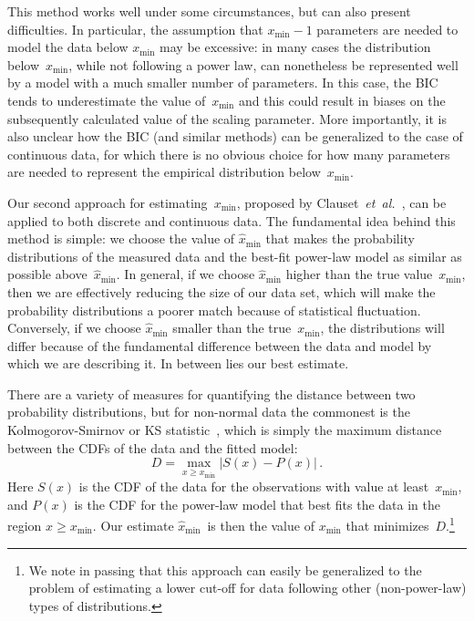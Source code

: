 \documentclass[final]{siamltex}
\newcommand{\etal}{\textit{et~al.}}
\newcommand{\xmin}{\ensuremath{x_{\min}}}
\newcommand{\punctspace}{\,}
\begin{document}
This method works well under some circumstances, but can also present
difficulties.  In particular, the assumption that $\xmin-1$ parameters are
needed to model the data below $\xmin$ may be excessive: in many cases the
distribution below~$\xmin$, while not following a power law, can
nonetheless be represented well by a model with a much smaller number of
parameters.  In this case, the BIC tends to underestimate the value
of~$\xmin$ and this could result in biases on the subsequently calculated
value of the scaling parameter.  More importantly, it is also unclear how
the BIC (and similar methods) can be generalized to the case of continuous
data, for which there is no obvious choice for how many parameters are
needed to represent the empirical distribution below~$\xmin$.

Our second approach for estimating~$\xmin$, proposed by
Clauset~\etal~\cite{Clauset07}, can be applied to both discrete and
continuous data.  The fundamental idea behind this method is simple: we
choose the value of $\hat{x}_{\min}$ that makes the probability
distributions of the measured data and the best-fit power-law model as
similar as possible above~$\hat{x}_{\min}$.  In general, if we choose
$\hat{x}_{\min}$ higher than the true value~$\xmin$, then we are
effectively reducing the size of our data set, which will make the
probability distributions a poorer match because of statistical
fluctuation.  Conversely, if we choose $\hat{x}_{\min}$ smaller than the
true~$\xmin$, the distributions will differ because of the fundamental
difference between the data and model by which we are describing it.  In
between lies our best estimate.

There are a variety of measures for quantifying the distance between two
probability distributions, but for non-normal data the commonest is the
Kolmogorov-Smirnov or KS statistic~\cite{Numerical-Recipes-in-C}, which is
simply the maximum distance between the CDFs of the data and the fitted model:
\begin{equation}
 D = \max_{x\ge \xmin} \left| S(x) - P(x) \right| \punctspace.
\label{eq:ks}
\end{equation}
Here $S(x)$ is the CDF of the data for the observations with value at
least~$\xmin$, and $P(x)$ is the CDF for the power-law model that best fits
the data in the region $x\ge\xmin$.  Our estimate $\hat{x}_{\min}$~is then
the value of $\xmin$ that minimizes~$D$.\footnote{We note in passing that
 this approach can easily be generalized to the problem of estimating a
 lower cut-off for data following other (non-power-law) types of
 distributions.}
\end{document}
